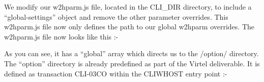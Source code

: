 \documentclass[letterpaper,10pt,english]{sphinxmanual}
\begin{document}
\begin{sphinxVerbatim}[commandchars=\\\{\}]
      
   
       
       
       
\end{sphinxVerbatim}

We modify our w2hparm.js file, located in the CLI\_DIR directory, to include a “global-settings” object and remove the other parameter overrides. This w2hparm.js file now only defines the path to our global w2hparm overrides. The w2hparm.js file now looks like this :-

\begin{sphinxVerbatim}[commandchars=\\\{\}]
   
   
\end{sphinxVerbatim}

As you can see, it has a “global” array which directs us to the /option/ directory. The “option” directory is already predefined as part of the Virtel deliverable. It is defined as transaction CLI-03CO within the CLIWHOST entry point :-
\end{document}
